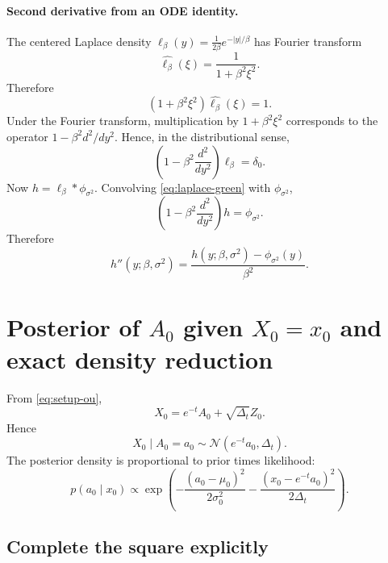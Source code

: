 \documentclass[11pt,a4paper]{article}
\newcommand{\Dt}{\Delta_t}
\begin{document}
\paragraph{Second derivative from an ODE identity.}
The centered Laplace density $\ell_\beta(y)=\frac{1}{2\beta}e^{-|y|/\beta}$ has Fourier transform
\[
\widehat{\ell_\beta}(\xi)=\frac{1}{1+\beta^2 \xi^2}.
\]
Therefore
\[
(1+\beta^2 \xi^2) \widehat{\ell_\beta}(\xi) = 1.
\]
Under the Fourier transform, multiplication by $1+\beta^2\xi^2$ corresponds to the operator $1-\beta^2 d^2/dy^2$. Hence, in the distributional sense,
\begin{equation}
\left(1-\beta^2 \frac{d^2}{dy^2}\right) \ell_\beta = \delta_0.
\label{eq:laplace-green}
\end{equation}
Now $h = \ell_\beta * \phi_{\sigma^2}$. Convolving \eqref{eq:laplace-green} with $\phi_{\sigma^2}$,
\[
\left(1-\beta^2 \frac{d^2}{dy^2}\right) h = \phi_{\sigma^2}.
\]
Therefore
\begin{equation}
h''(y;\beta,\sigma^2)
=
\frac{h(y;\beta,\sigma^2) - \phi_{\sigma^2}(y)}{\beta^2}.
\label{eq:hsecond-final}
\end{equation}

\section[Posterior of A0 given X0=x0 and exact density reduction]{Posterior of $A_0$ given $X_0=x_0$ and exact density reduction}
\label{sec:posterior-reduction}

From \eqref{eq:setup-ou},
\[
X_0 = e^{-t} A_0 + \sqrt{\Dt} Z_0.
\]
Hence
\[
X_0 \mid A_0=a_0 \sim \mathcal N(e^{-t} a_0, \Dt).
\]
The posterior density is proportional to prior times likelihood:
\begin{equation}
p(a_0\mid x_0)
\propto
\exp\!\left(
-\frac{(a_0-\mu_0)^2}{2\sigma_0^2}
-\frac{(x_0-e^{-t}a_0)^2}{2\Dt}
\right).
\label{eq:posterior-start}
\end{equation}

\subsection{Complete the square explicitly}
\end{document}
